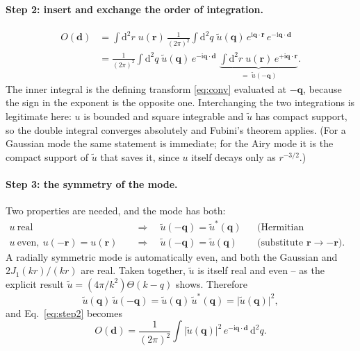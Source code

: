 \documentclass[11pt,a4paper]{article}
\newcommand{\dd}{\mathrm d}
\begin{document}
\paragraph{Step 2: insert and exchange the order of integration.}
\begin{align}
O(\mathbf d)
&=\int\!\dd^2r\; u(\mathbf r)\,\frac{1}{(2\pi)^2}
  \int\!\dd^2q\;\tilde u(\mathbf q)\,e^{\mathrm i\mathbf q\cdot\mathbf r}\,
  e^{-\mathrm i\mathbf q\cdot\mathbf d}\\[2pt]
&=\frac{1}{(2\pi)^2}\int\!\dd^2q\;\tilde u(\mathbf q)\,
  e^{-\mathrm i\mathbf q\cdot\mathbf d}\;
  \underbrace{\int\!\dd^2r\; u(\mathbf r)\,e^{+\mathrm i\mathbf q\cdot\mathbf r}}
            _{\textstyle =\;\tilde u(-\mathbf q)} .
\label{eq:step2}
\end{align}
The inner integral is the defining transform \eqref{eq:conv} evaluated at
$-\mathbf q$, because the sign in the exponent is the opposite one.
Interchanging the two integrations is legitimate here: $u$ is bounded and
square integrable and $\tilde u$ has compact support, so the double integral
converges absolutely and Fubini's theorem applies. (For a Gaussian mode the
same statement is immediate; for the Airy mode it is the compact support of
$\tilde u$ that saves it, since $u$ itself decays only as $r^{-3/2}$.)

\paragraph{Step 3: the symmetry of the mode.} Two properties are needed, and
the mode has both:
\begin{align}
u \ \text{real} \quad&\Longrightarrow\quad
  \tilde u(-\mathbf q)=\tilde u^{*}(\mathbf q) &&\text{(Hermitian symmetry),}\\
u \ \text{even},\ u(-\mathbf r)=u(\mathbf r) \quad&\Longrightarrow\quad
  \tilde u(-\mathbf q)=\tilde u(\mathbf q) &&\text{(substitute } \mathbf r\to-\mathbf r).
\end{align}
A radially symmetric mode is automatically even, and both the Gaussian and
$2J_1(kr)/(kr)$ are real. Taken together, $\tilde u$ is itself real and even --
as the explicit result $\tilde u=(4\pi/k^2)\Theta(k-q)$ shows. Therefore
\begin{equation}
\tilde u(\mathbf q)\,\tilde u(-\mathbf q)
=\tilde u(\mathbf q)\,\tilde u^{*}(\mathbf q)
=\bigl|\tilde u(\mathbf q)\bigr|^{2} ,
\end{equation}
and Eq.~\eqref{eq:step2} becomes
\begin{equation}
O(\mathbf d)=\frac{1}{(2\pi)^2}\int\!\bigl|\tilde u(\mathbf q)\bigr|^{2}\,
             e^{-\mathrm i\mathbf q\cdot\mathbf d}\,\dd^2q .
\label{eq:step3}
\end{equation}
\end{document}
